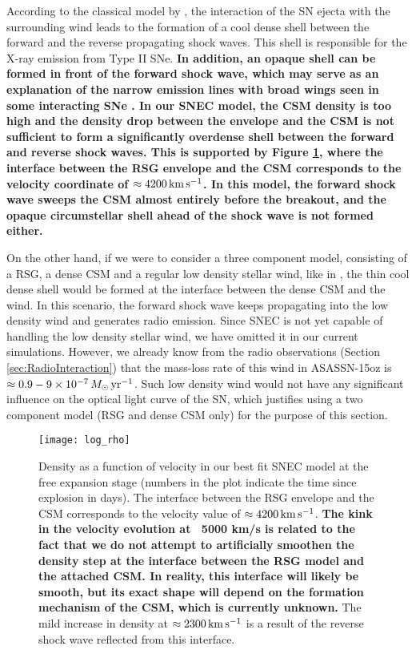 \documentclass[a4paper,fleqn,usenatbib]{mnras}
\begin{document}
According to the classical model by \citet{1982chevalier}, the interaction of the SN ejecta with the surrounding wind leads to the formation of a cool dense shell between the forward and the reverse propagating shock waves. 
This shell is responsible for the X-ray emission from Type II SNe. 
\textbf{In addition, an opaque shell can be formed in front of the forward shock wave, which may serve as an explanation of the narrow emission lines with broad wings seen in some interacting SNe \citep{2001chugai}. 
In our SNEC model, the CSM density is too high and the density drop between the envelope and the CSM is not sufficient to form a significantly overdense shell between the forward and reverse shock waves. 
This is supported by  Figure \ref{fig:CDS}, where the interface between the RSG envelope and the CSM corresponds to the velocity coordinate of $\approx 4200\,{\rm km}\,{\rm s}^{-1}$. 
In this model, the forward shock wave sweeps the CSM almost entirely before the breakout, and the opaque circumstellar shell ahead of the shock wave is not formed either.}

On the other hand, if we were to consider a three component model, consisting of a RSG, a dense CSM and a regular low density stellar wind, like in \citet{2018morozova}, the thin cool dense shell would be formed at the interface between the dense CSM and the wind. 
In this scenario, the forward shock wave keeps propagating into the low density wind and generates radio emission. Since SNEC is not yet capable of handling the low density stellar wind, we have omitted it in our current simulations. 
However, we already know from the radio observations (Section \ref{sec:RadioInteraction}) that the mass-loss rate of this wind in ASASSN-15oz is $\approx 0.9-9\times 10^{-7}\,M_{\odot}\,{\rm yr}^{-1}$.
Such low density wind would not have any significant influence on the optical light curve of the SN, which justifies using a two component model (RSG and dense CSM only) for the purpose of this section.
\begin{figure}
\begin{center}
\texttt{[image: log\_rho]} %
\caption{Density as a function of velocity in our best fit SNEC model at the free expansion stage (numbers in the plot indicate the time since explosion in days). 
The interface between the RSG envelope and the CSM corresponds to the velocity value of $\approx 4200\,{\rm km}\,{\rm s}^{-1}$. 
\textbf{The kink in the velocity evolution at ~5000 km/s is related to the fact that we do not attempt to artificially smoothen the density step at the interface between the RSG model and the attached CSM. 
In reality, this interface will likely be smooth, but its exact shape will depend on the formation mechanism of the CSM, which is currently unknown.}
The mild increase in density at $\approx 2300\,{\rm km}\,{\rm s}^{-1}$ is a result of the reverse shock wave reflected from this interface.}
\label{fig:CDS}
\end{center}
\end{figure}
\end{document}
